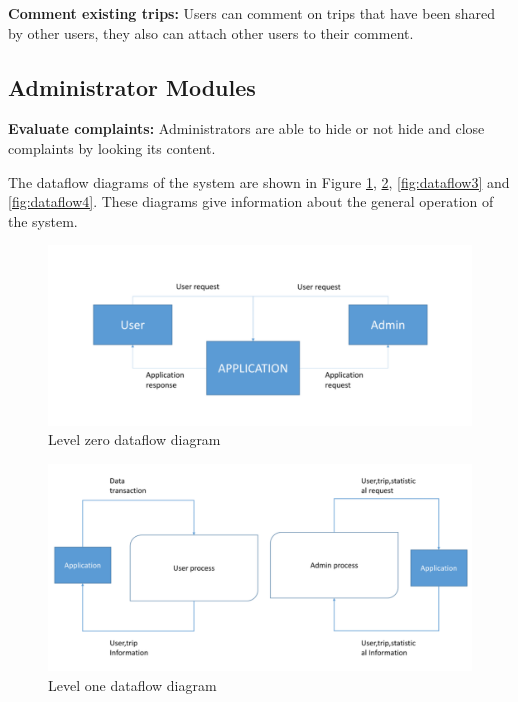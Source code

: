 \textbf{Comment existing trips:} Users can comment on trips that have been shared by other users, they also can attach other users to their comment.

\subsection{Administrator Modules}
\textbf{Evaluate complaints:} Administrators are able to hide or not hide and close complaints by looking its content.

\newpage
The dataflow diagrams of the system are shown in Figure \ref{fig:dataflow}, \ref{fig:dataflow2}, \ref{fig:dataflow3} and \ref{fig:dataflow4}.
\newline
These diagrams give information about the general operation of the system.
\begin{figure}[!ht]
\centering
\includegraphics[scale=0.6]{projectChapters/images/dataflow.png}
\caption{Level zero dataflow diagram }
\label{fig:dataflow}
\end{figure}

\begin{figure}[!ht]
\centering
\includegraphics[scale=0.6]{projectChapters/images/dataflow2.png}
\caption{Level one dataflow diagram}
\label{fig:dataflow2}
\end{figure}

